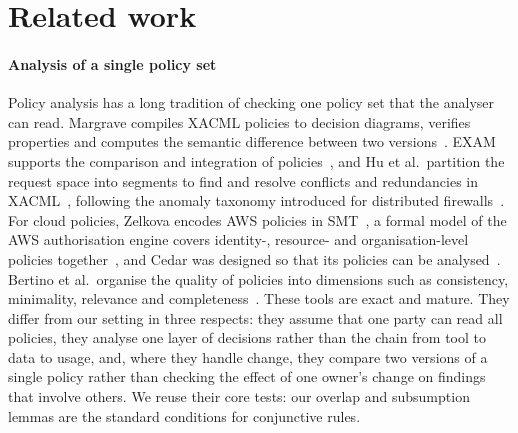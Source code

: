 \section{Related work}\label{sec:related}

\paragraph{Analysis of a single policy set} Policy analysis has a long tradition of checking one policy set that the analyser can read. Margrave compiles XACML policies to decision diagrams, verifies properties and computes the semantic difference between two versions~\cite{fisler2005margrave}. EXAM supports the comparison and integration of policies~\cite{lin2010exam}, and Hu et al.\ partition the request space into segments to find and resolve conflicts and redundancies in XACML~\cite{hu2013anomalies}, following the anomaly taxonomy introduced for distributed firewalls~\cite{alshaer2004firewalls}. For cloud policies, Zelkova encodes AWS policies in SMT~\cite{backes2018zelkova}, a formal model of the AWS authorisation engine covers identity-, resource- and organisation-level policies together~\cite{barnett2025authz}, and Cedar was designed so that its policies can be analysed~\cite{cutler2024cedar}. Bertino et al.\ organise the quality of policies into dimensions such as consistency, minimality, relevance and completeness~\cite{bertino2018quality}. These tools are exact and mature. They differ from our setting in three respects: they assume that one party can read all policies, they analyse one layer of decisions rather than the chain from tool to data to usage, and, where they handle change, they compare two versions of a single policy rather than checking the effect of one owner's change on findings that involve others. We reuse their core tests: our overlap and subsumption lemmas are the standard conditions for conjunctive rules.

